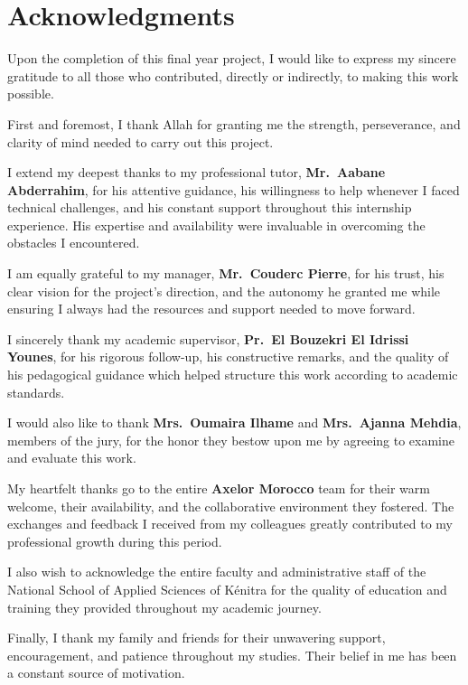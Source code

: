 \chapter*{Acknowledgments}

Upon the completion of this final year project, I would like to express my sincere gratitude to all those who contributed, directly or indirectly, to making this work possible.

First and foremost, I thank Allah for granting me the strength, perseverance, and clarity of mind needed to carry out this project.

I extend my deepest thanks to my professional tutor, \textbf{Mr.~Aabane Abderrahim}, for his attentive guidance, his willingness to help whenever I faced technical challenges, and his constant support throughout this internship experience. His expertise and availability were invaluable in overcoming the obstacles I encountered.

I am equally grateful to my manager, \textbf{Mr.~Couderc Pierre}, for his trust, his clear vision for the project's direction, and the autonomy he granted me while ensuring I always had the resources and support needed to move forward.

I sincerely thank my academic supervisor, \textbf{Pr.~El Bouzekri El Idrissi Younes}, for his rigorous follow-up, his constructive remarks, and the quality of his pedagogical guidance which helped structure this work according to academic standards.

I would also like to thank \textbf{Mrs.~Oumaira Ilhame} and \textbf{Mrs.~Ajanna Mehdia}, members of the jury, for the honor they bestow upon me by agreeing to examine and evaluate this work.

My heartfelt thanks go to the entire \textbf{Axelor Morocco} team for their warm welcome, their availability, and the collaborative environment they fostered. The exchanges and feedback I received from my colleagues greatly contributed to my professional growth during this period.

I also wish to acknowledge the entire faculty and administrative staff of the National School of Applied Sciences of Kénitra for the quality of education and training they provided throughout my academic journey.

Finally, I thank my family and friends for their unwavering support, encouragement, and patience throughout my studies. Their belief in me has been a constant source of motivation.
